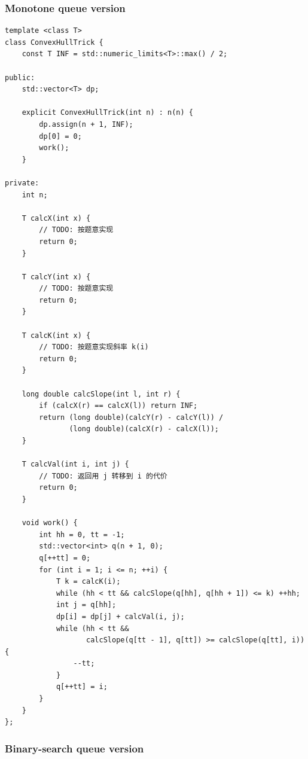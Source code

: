     \subsubsection{Monotone queue version}

        \begin{lstlisting}
template <class T>
class ConvexHullTrick {
    const T INF = std::numeric_limits<T>::max() / 2;

public:
    std::vector<T> dp;

    explicit ConvexHullTrick(int n) : n(n) {
        dp.assign(n + 1, INF);
        dp[0] = 0;
        work();
    }

private:
    int n;

    T calcX(int x) {
        // TODO: 按题意实现
        return 0;
    }

    T calcY(int x) {
        // TODO: 按题意实现
        return 0;
    }

    T calcK(int x) {
        // TODO: 按题意实现斜率 k(i)
        return 0;
    }

    long double calcSlope(int l, int r) {
        if (calcX(r) == calcX(l)) return INF;
        return (long double)(calcY(r) - calcY(l)) /
               (long double)(calcX(r) - calcX(l));
    }

    T calcVal(int i, int j) {
        // TODO: 返回用 j 转移到 i 的代价
        return 0;
    }

    void work() {
        int hh = 0, tt = -1;
        std::vector<int> q(n + 1, 0);
        q[++tt] = 0;
        for (int i = 1; i <= n; ++i) {
            T k = calcK(i);
            while (hh < tt && calcSlope(q[hh], q[hh + 1]) <= k) ++hh;
            int j = q[hh];
            dp[i] = dp[j] + calcVal(i, j);
            while (hh < tt &&
                   calcSlope(q[tt - 1], q[tt]) >= calcSlope(q[tt], i)) {
                --tt;
            }
            q[++tt] = i;
        }
    }
};
        \end{lstlisting}

    \subsubsection{Binary-search queue version}

